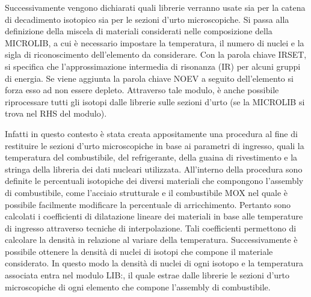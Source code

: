 Successivamente vengono dichiarati quali librerie verranno usate sia per la 
catena di decadimento isotopico sia per le sezioni d'urto microscopiche.
Si passa alla definizione della miscela di materiali considerati nelle composizione della 
MICROLIB, a cui è necessario impostare la temperatura, il numero di nuclei e la 
sigla di riconoscimento dell'elemento da considerare.
Con la parola chiave IRSET, si specifica che l'approssimazione intermedia di 
risonanza (IR) per alcuni gruppi di energia.
Se viene aggiunta la parola chiave NOEV a seguito dell'elemento si forza esso 
ad 
non essere depleto.
Attraverso tale modulo, è anche possibile riprocessare tutti gli isotopi dalle 
librerie sulle sezioni d'urto (se la MICROLIB si trova nel RHS del modulo).

Infatti in questo contesto è stata creata appositamente una procedura al fine 
di 
restituire le sezioni d'urto microscopiche in base ai parametri di ingresso, 
quali la temperatura del combustibile, del refrigerante, della guaina di 
rivestimento e la stringa della libreria dei dati nucleari utilizzata.
All'interno della procedura sono definite le percentuali isotopiche dei diversi 
materiali che compongono l'assembly di combustibile, come l'acciaio strutturale 
e il combustibile MOX nel quale è possibile facilmente modificare la 
percentuale 
di arricchimento.
Pertanto sono calcolati i coefficienti di dilatazione lineare dei materiali in 
base alle temperature di ingresso attraverso tecniche di interpolazione. Tali 
coefficienti permettono di calcolare la densità in relazione al variare della 
temperatura.
Successivamente è possibile ottenere la densità di nuclei di isotopi che 
compone il materiale considerato.
In questo modo la densità di nuclei di ogni isotopo e la temperatura associata
entra nel modulo LIB:, il quale estrae dalle librerie le sezioni d'urto microscopiche 
di ogni 
elemento che compone l'assembly di combustibile.


